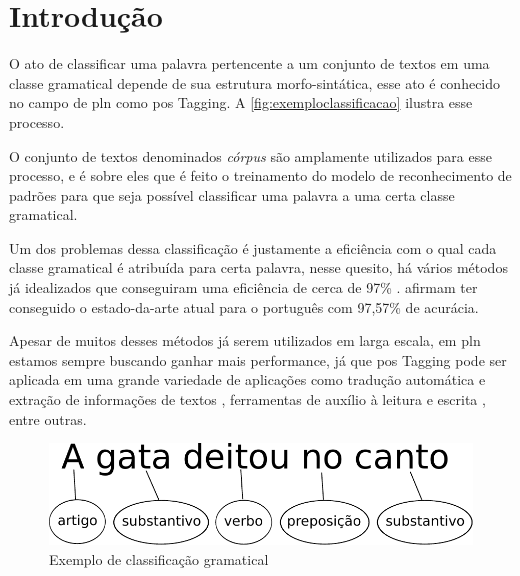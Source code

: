 \chapter{Introdução}\label{introducao}

O ato de classificar uma palavra pertencente a um conjunto de textos em uma classe gramatical depende de sua estrutura morfo-sintática, esse ato é conhecido no campo de \ac{pln} como \ac{pos} Tagging. A \autoref{fig:exemploclassificacao} ilustra esse processo. 

O conjunto de textos denominados \textit{córpus} são amplamente utilizados para esse processo, e é sobre eles que é feito o treinamento do modelo de reconhecimento de padrões para que seja possível classificar uma palavra a uma certa classe gramatical.

Um dos problemas dessa classificação é justamente a eficiência com o qual cada classe gramatical é atribuída para certa palavra, nesse quesito, há vários métodos já idealizados que conseguiram uma eficiência de cerca de 97\% \cite{dos2014training, collobert2011deep, fonseca2015evaluating}.  afirmam ter conseguido o estado-da-arte atual para o português com 97,57\% de acurácia.

Apesar de muitos desses métodos já serem utilizados em larga escala, em \ac{pln} estamos sempre buscando ganhar mais performance, já que \ac{pos} Tagging pode ser aplicada em uma grande variedade de aplicações como tradução automática e extração de informações de textos \cite{manning1999foundations}, ferramentas de auxílio à leitura e escrita \cite{marquiafavel2010processo}, entre outras.

\begin{figure}[htb]
  \caption{Exemplo de classificação gramatical}\label{fig:exemploclassificacao}
  \begin{center}
      \includegraphics[scale=0.75]{img/exemploclassificacao.pdf}
  \end{center}
\end{figure}

